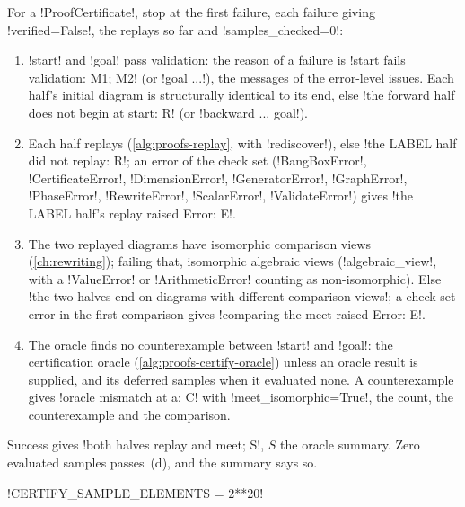 \begin{algorithm}\label{alg:proofs-check}
For a \py!ProofCertificate!, stop at the first failure, each failure giving \py!verified=False!, the replays so far and \py!samples_checked=0!:
\begin{enumerate}
\item[(a)] \py!start! and \py!goal! pass validation: the reason of a failure is \code!start fails validation: M1; M2! (or \code!goal ...!), the messages of the error-level issues. Each half's initial diagram is structurally identical to its end, else \code!the forward half does not begin at start: R! (or \code!backward ... goal!).
\item[(b)] Each half replays (\cref{alg:proofs-replay}, with \py!rediscover!), else \code!the LABEL half did not replay: R!; an error of the check set (\py!BangBoxError!, \py!CertificateError!, \py!DimensionError!, \py!GeneratorError!, \py!GraphError!, \py!PhaseError!, \py!RewriteError!, \py!ScalarError!, \py!ValidateError!) gives \code!the LABEL half's replay raised Error: E!.
\item[(c)] The two replayed diagrams have isomorphic comparison views (\cref{ch:rewriting}); failing that, isomorphic algebraic views (\py!algebraic_view!, with a \py!ValueError! or \py!ArithmeticError! counting as non-isomorphic). Else \code!the two halves end on diagrams with different comparison views!; a check-set error in the first comparison gives \code!comparing the meet raised Error: E!.
\item[(d)] The oracle finds no counterexample between \py!start! and \py!goal!: the certification oracle (\cref{alg:proofs-certify-oracle}) unless an oracle result is supplied, and its deferred samples when it evaluated none. A counterexample gives \code!oracle mismatch at {a}: C! with \py!meet_isomorphic=True!, the count, the counterexample and the comparison.
\end{enumerate}
Success gives \code!both halves replay and meet; S!, $S$ the oracle summary. Zero evaluated samples passes~(d), and the summary says so.
\end{algorithm}

\begin{signature}
\py!CERTIFY_SAMPLE_ELEMENTS = 2**20!
\end{signature}

